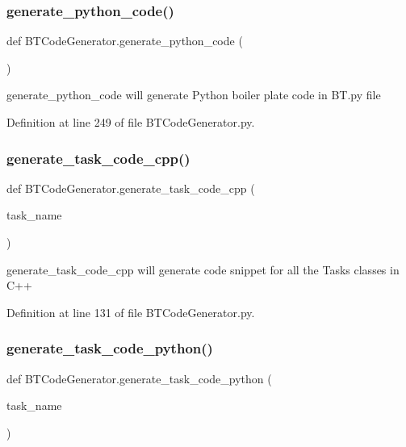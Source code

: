 \subsubsection{\texorpdfstring{generate\_python\_code()}{generate\_python\_code()}}
{\footnotesize\ttfamily def B\+T\+Code\+Generator.\+generate\+\_\+python\+\_\+code (\begin{DoxyParamCaption}{ }\end{DoxyParamCaption})}



\textquotesingle{}generate\+\_\+python\+\_\+code\textquotesingle{} will generate Python boiler plate code in \textquotesingle{}B\+T.\+py\textquotesingle{} file 



Definition at line 249 of file B\+T\+Code\+Generator.\+py.

\mbox{\label{namespace_b_t_code_generator_a66ace159dbed0899e297cc547dbc66b8}} 
\subsubsection{\texorpdfstring{generate\_task\_code\_cpp()}{generate\_task\_code\_cpp()}}
{\footnotesize\ttfamily def B\+T\+Code\+Generator.\+generate\+\_\+task\+\_\+code\+\_\+cpp (\begin{DoxyParamCaption}\item[{}]{task\+\_\+name }\end{DoxyParamCaption})}



\textquotesingle{}generate\+\_\+task\+\_\+code\+\_\+cpp\textquotesingle{} will generate code snippet for all the Tasks classes in C++ 



Definition at line 131 of file B\+T\+Code\+Generator.\+py.

\mbox{\label{namespace_b_t_code_generator_ab9d9b9738c0d565484f12231bc202158}} 
\subsubsection{\texorpdfstring{generate\_task\_code\_python()}{generate\_task\_code\_python()}}
{\footnotesize\ttfamily def B\+T\+Code\+Generator.\+generate\+\_\+task\+\_\+code\+\_\+python (\begin{DoxyParamCaption}\item[{}]{task\+\_\+name }\end{DoxyParamCaption})}



